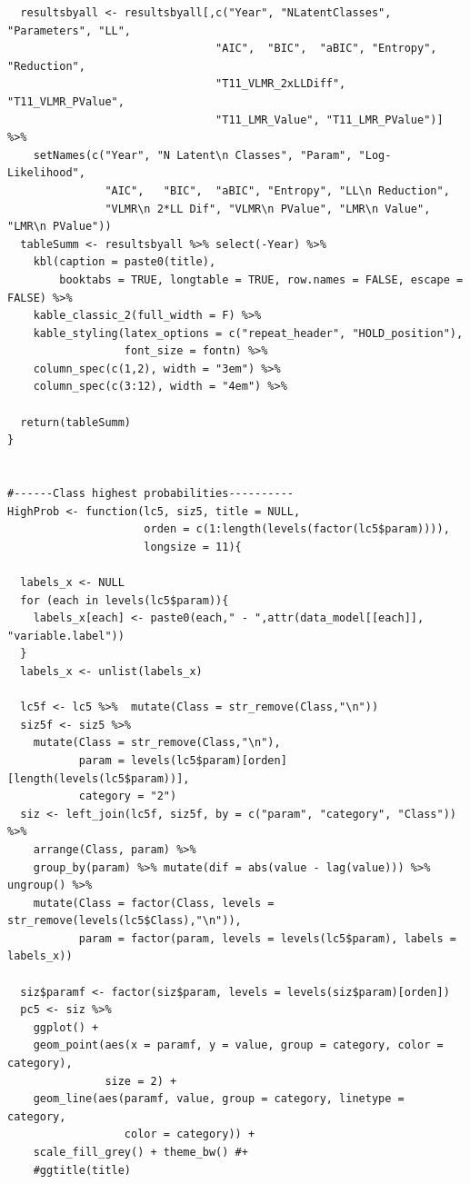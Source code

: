 \documentclass[12pt,a4paper,oneside]{reedthesis}
\begin{document}
\begin{verbatim}
  resultsbyall <- resultsbyall[,c("Year", "NLatentClasses", "Parameters", "LL", 
                                "AIC",  "BIC",  "aBIC", "Entropy", "Reduction",
                                "T11_VLMR_2xLLDiff", "T11_VLMR_PValue",  
                                "T11_LMR_Value", "T11_LMR_PValue")] %>% 
    setNames(c("Year", "N Latent\n Classes", "Param", "Log-Likelihood", 
               "AIC",   "BIC",  "aBIC", "Entropy", "LL\n Reduction",
               "VLMR\n 2*LL Dif", "VLMR\n PValue", "LMR\n Value", "LMR\n PValue"))
  tableSumm <- resultsbyall %>% select(-Year) %>% 
    kbl(caption = paste0(title), 
        booktabs = TRUE, longtable = TRUE, row.names = FALSE, escape = FALSE) %>%
    kable_classic_2(full_width = F) %>% 
    kable_styling(latex_options = c("repeat_header", "HOLD_position"), 
                  font_size = fontn) %>% 
    column_spec(c(1,2), width = "3em") %>% 
    column_spec(c(3:12), width = "4em") %>% 
  
  return(tableSumm)
}


#------Class highest probabilities----------
HighProb <- function(lc5, siz5, title = NULL, 
                     orden = c(1:length(levels(factor(lc5$param)))), 
                     longsize = 11){

  labels_x <- NULL
  for (each in levels(lc5$param)){
    labels_x[each] <- paste0(each," - ",attr(data_model[[each]], "variable.label"))
  }
  labels_x <- unlist(labels_x)
  
  lc5f <- lc5 %>%  mutate(Class = str_remove(Class,"\n"))
  siz5f <- siz5 %>%
    mutate(Class = str_remove(Class,"\n"),
           param = levels(lc5$param)[orden][length(levels(lc5$param))], 
           category = "2")
  siz <- left_join(lc5f, siz5f, by = c("param", "category", "Class")) %>% 
    arrange(Class, param) %>% 
    group_by(param) %>% mutate(dif = abs(value - lag(value))) %>% ungroup() %>% 
    mutate(Class = factor(Class, levels = str_remove(levels(lc5$Class),"\n")),
           param = factor(param, levels = levels(lc5$param), labels = labels_x))
  
  siz$paramf <- factor(siz$param, levels = levels(siz$param)[orden])
  pc5 <- siz %>% 
    ggplot() +
    geom_point(aes(x = paramf, y = value, group = category, color = category), 
               size = 2) +
    geom_line(aes(paramf, value, group = category, linetype = category, 
                  color = category)) +
    scale_fill_grey() + theme_bw() #+
    #ggtitle(title) 
    

\end{verbatim}
\end{document}
